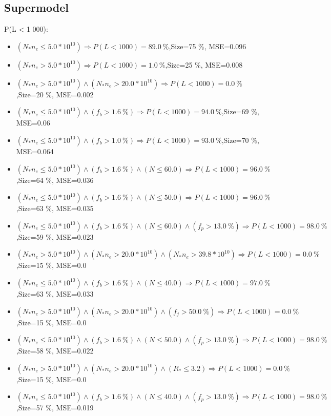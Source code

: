 \documentclass[numbered]{CSL}
\begin{document}
\subsection{Supermodel}
P(L < 1 000):
\begin{itemize}
\item $(N_* n_e \leq 5.0 * 10^{10}) \Rightarrow P(L < 1 000) = 89.0~\%$,\hfill Size=75 \%, MSE=0.096
\item $(N_* n_e > 5.0 * 10^{10}) \Rightarrow P(L < 1 000) = 1.0~\%$,\hfill Size=25 \%, MSE=0.008
\item $(N_* n_e > 5.0 * 10^{10}) \land (N_* n_e > 20.0 * 10^{10}) \Rightarrow P(L < 1 000) = 0.0~\%$,\hfill Size=20 \%, MSE=0.002
\item $(N_* n_e \leq 5.0 * 10^{10}) \land (f_b > 1.6~\%) \Rightarrow P(L < 1 000) = 94.0~\%$,\hfill Size=69 \%, MSE=0.06
\item $(N_* n_e \leq 5.0 * 10^{10}) \land (f_b > 1.0~\%) \Rightarrow P(L < 1 000) = 93.0~\%$,\hfill Size=70 \%, MSE=0.064
\item $(N_* n_e \leq 5.0 * 10^{10}) \land (f_b > 1.6~\%) \land (N \leq 60.0) \Rightarrow P(L < 1 000) = 96.0~\%$,\hfill Size=64 \%, MSE=0.036
\item $(N_* n_e \leq 5.0 * 10^{10}) \land (f_b > 1.6~\%) \land (N \leq 50.0) \Rightarrow P(L < 1 000) = 96.0~\%$,\hfill Size=63 \%, MSE=0.035
\item $(N_* n_e \leq 5.0 * 10^{10}) \land (f_b > 1.6~\%) \land (N \leq 60.0) \land (f_p > 13.0~\%) \Rightarrow P(L < 1 000) = 98.0~\%$,\hfill Size=59 \%, MSE=0.023
\item $(N_* n_e > 5.0 * 10^{10}) \land (N_* n_e > 20.0 * 10^{10}) \land (N_* n_e > 39.8 * 10^{10}) \Rightarrow P(L < 1 000) = 0.0~\%$,\hfill Size=15 \%, MSE=0.0
\item $(N_* n_e \leq 5.0 * 10^{10}) \land (f_b > 1.6~\%) \land (N \leq 40.0) \Rightarrow P(L < 1 000) = 97.0~\%$,\hfill Size=63 \%, MSE=0.033
\item $(N_* n_e > 5.0 * 10^{10}) \land (N_* n_e > 20.0 * 10^{10}) \land (f_j > 50.0~\%) \Rightarrow P(L < 1 000) = 0.0~\%$,\hfill Size=15 \%, MSE=0.0
\item $(N_* n_e \leq 5.0 * 10^{10}) \land (f_b > 1.6~\%) \land (N \leq 50.0) \land (f_p > 13.0~\%) \Rightarrow P(L < 1 000) = 98.0~\%$,\hfill Size=58 \%, MSE=0.022
\item $(N_* n_e > 5.0 * 10^{10}) \land (N_* n_e > 20.0 * 10^{10}) \land (R_* \leq 3.2) \Rightarrow P(L < 1 000) = 0.0~\%$,\hfill Size=15 \%, MSE=0.0
\item $(N_* n_e \leq 5.0 * 10^{10}) \land (f_b > 1.6~\%) \land (N \leq 40.0) \land (f_p > 13.0~\%) \Rightarrow P(L < 1 000) = 98.0~\%$,\hfill Size=57 \%, MSE=0.019

\end{itemize}
\end{document}
